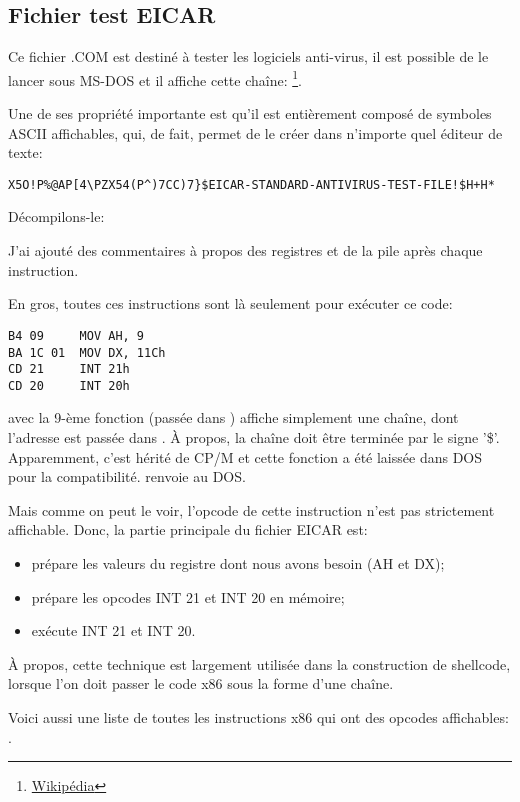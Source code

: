 
\subsection{ Fichier test EICAR}
\label{subsec:EICAR}

Ce fichier .COM est destiné à tester les logiciels anti-virus, il est possible de
le lancer sous MS-DOS et il affiche cette chaîne: 
\footnote{\href{http://go.yurichev.com/17006}{Wikipédia}}.

Une de ses propriété importante est qu'il est entièrement composé de symboles ASCII
affichables, qui, de fait, permet de le créer dans n'importe quel éditeur de texte:

\begin{lstlisting}
X5O!P%@AP[4\PZX54(P^)7CC)7}$EICAR-STANDARD-ANTIVIRUS-TEST-FILE!$H+H*
\end{lstlisting}

Décompilons-le:



J'ai ajouté des commentaires à propos des registres et de la pile après chaque instruction.

En gros, toutes ces instructions sont là seulement pour exécuter ce code:

\begin{lstlisting}[style=customasmx86]
B4 09     MOV AH, 9
BA 1C 01  MOV DX, 11Ch
CD 21     INT 21h
CD 20     INT 20h
\end{lstlisting}

 avec la 9-ème fonction (passée dans ) affiche simplement une chaîne,
dont l'adresse est passée dans .
À propos, la chaîne doit être terminée par le signe '\$'.
Apparemment, c'est hérité de \gls{CP/M} et cette fonction a été laissée dans DOS
pour la compatibilité.
 renvoie au DOS.

Mais comme on peut le voir, l'opcode de cette instruction n'est pas strictement
affichable.
Donc, la partie principale du fichier EICAR est:

\begin{itemize}
\item prépare les valeurs du registre dont nous avons besoin (AH et DX);
\item prépare les opcodes INT 21 et INT 20 en mémoire;
\item exécute INT 21 et INT 20.
\end{itemize}


À propos, cette technique est largement utilisée dans la construction de shellcode,
lorsque l'on doit passer le code x86 sous la forme d'une chaîne.

Voici aussi une liste de toutes les instructions x86 qui ont des opcodes affichables:
.
